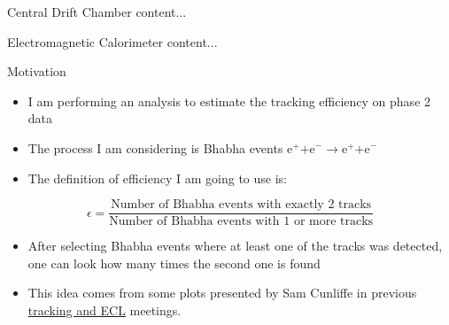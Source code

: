 \documentclass[8pt]{beamer}
\begin{document}
\begin{frame}{Central Drift Chamber}
	content...
\end{frame}








\begin{frame}{Electromagnetic Calorimeter}
	content...
\end{frame}





\begin{frame}{Motivation}

\begin{itemize}	
	\item I am performing an analysis to estimate the tracking efficiency on phase 2 data
	\item The process I am considering is Bhabha events $\textrm{e}^+ \textrm{+e}^- \rightarrow \textrm{e}^+ \textrm{+e}^- $ 
	\item The definition of efficiency I am going to use is:

\end{itemize}
	\begin{equation*}
		\epsilon = \frac{\textrm{Number of Bhabha events with exactly 2 tracks}}{\textrm{Number of Bhabha events with 1 or more tracks}}
	\end{equation*}
	
	\begin{itemize}
		\item After selecting Bhabha events where at least one of the tracks was detected, one can look how many times the second one is found
		\item  This idea comes from some plots presented by Sam Cunliffe in previous  \href{https://confluence.desy.de/display/BI/ECL+Meetings?preview=/84320165/109161400/SCunliffe181123-ECL.pdf}{tracking and ECL} meetings.
	\end{itemize}





\end{frame}
	
\end{document}
